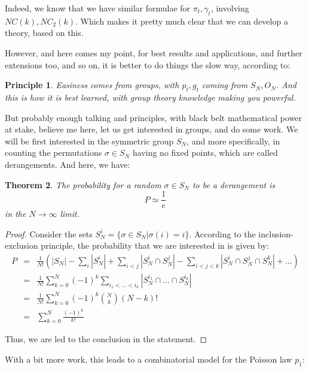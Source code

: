 \documentclass[12pt]{amsbook}
\newtheorem{theorem}{Theorem}[chapter]
\newtheorem{principle}[theorem]{Principle}
\begin{document}
Indeed, we know that we have similar formulae for $\pi_t,\gamma_t$, involving $NC(k),NC_2(k)$. Which makes it pretty much clear that we can develop a theory, based on this.

\bigskip

However, and here comes my point, for best results and applications, and further extensions too, and so on, it is better to do things the slow way, according to:

\begin{principle}
Easiness comes from groups, with $p_t,g_t$ coming from $S_N,O_N$. And this is how it is best learned, with group theory knowledge making you powerful.
\end{principle}

But probably enough talking and principles, with black belt mathematical power at stake, believe me here, let us get interested in groups, and do some work. We will be first interested in the symmetric group $S_N$, and more specifically, in counting the permutations $\sigma\in S_N$ having no fixed points, which are called derangements. And here, we have:


\begin{theorem}
The probability for a random $\sigma\in S_N$ to be a derangement is
$$P\simeq\frac{1}{e}$$
in the $N\to\infty$ limit.
\end{theorem}

\begin{proof}
Consider the sets $S_N^i=\{\sigma\in S_N|\sigma(i)=i\}$. According to the inclusion-exclusion principle, the probability that we are interested in is given by:
\begin{eqnarray*}
P
&=&\frac{1}{N!}\left(|S_N|-\sum_i|S_N^i|+\sum_{i<j}|S_N^i\cap S_N^j|-\sum_{i<j<k}|S_N^i\cap S_N^j\cap S_N^k|+\ldots\right)\\
&=&\frac{1}{N!}\sum_{k=0}^N(-1)^k\sum_{i_1<\ldots<i_k}|S_N^{i_1}\cap\ldots\cap S_N^{i_k}|\\
&=&\frac{1}{N!}\sum_{k=0}^N(-1)^k\binom{N}{k}(N-k)!\\
&=&\sum_{k=0}^N\frac{(-1)^k}{k!}
\end{eqnarray*}

Thus, we are led to the conclusion in the statement.
\end{proof}

With a bit more work, this leads to a combinatorial model for the Poisson law $p_1$:

\end{document}
